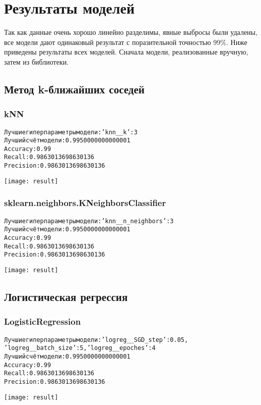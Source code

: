 \graphicspath{{images/}}
\section{Результаты моделей}
Так как данные очень хорошо линейно разделимы, явные выбросы были удалены, все модели дают одинаковый результат с поразительной точностью 99\%. Ниже приведены результаты всех моделей. Сначала модели, реализованные вручную, затем из библиотеки.

\subsection{Метод k-ближайших соседей}
\subsubsection{kNN}
\begin{alltt}
Лучшие гиперпараметры модели: {'knn__k': 3}
Лучший счёт модели: 0.9950000000000001
Accuracy: 0.99
Recall: 0.9863013698630136
Precision: 0.9863013698630136
\end{alltt}
\begin{center}
\texttt{[image: result]}
\end{center}

\subsubsection{sklearn.neighbors.KNeighborsClassifier}
\begin{alltt}
Лучшие гиперпараметры модели: {'knn__n_neighbors': 3}
Лучший счёт модели: 0.9950000000000001
Accuracy: 0.99
Recall: 0.9863013698630136
Precision: 0.9863013698630136
\end{alltt}
\begin{center}
\texttt{[image: result]}
\end{center}
\pagebreak

\subsection{Логистическая регрессия}
\subsubsection{LogisticRegression}
\begin{alltt}
Лучшие гиперпараметры модели: {'logreg__SGD_step': 0.05,
'logreg__batch_size': 5, 'logreg__epoches': 4}
Лучший счёт модели: 0.9950000000000001
Accuracy: 0.99
Recall: 0.9863013698630136
Precision: 0.9863013698630136
\end{alltt}
\begin{center}
\texttt{[image: result]}
\end{center}

